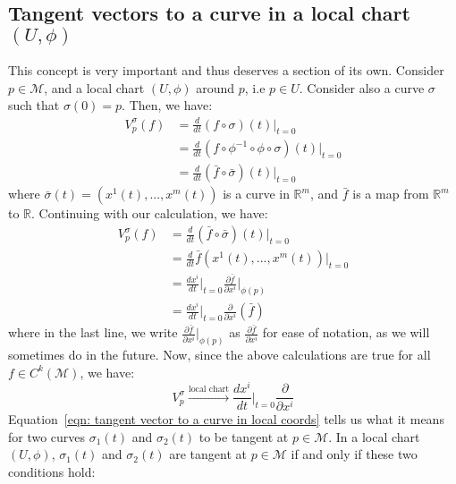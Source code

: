     \subsection{Tangent vectors to a curve in a local chart $(U,\phi)$}
      This concept is very important and thus deserves a section of its
      own. Consider $p\in \mathcal{M}$, and a local chart $(U,\phi)$ around
      $p$, i.e $p\in U$. Consider also a curve $\sigma$ such that
      $\sigma(0)= p$.
      Then, we have:
        \begin{align*}
          V^{\sigma}_{p}(f) &= \frac{d}{dt}(f\circ\sigma)(t)\Bigr|_{t=0} \\
          &= \frac{d}{dt}(f\circ\phi^{-1}\circ \phi \circ
          \sigma)(t)\Bigr|_{t=0} \\
          &= \frac{d}{dt}(\bar{f}\circ\bar{\sigma})(t)\Bigr|_{t=0}
        \end{align*}
      where $\bar{\sigma}(t) = \left(x^1(t),...,x^m(t)\right)$ is a curve
      in $\mathbb{R}^m$, and $\bar{f}$ is a map from $\mathbb{R}^m$ to
      $\mathbb{R}$. Continuing with our calculation, we have:
        \begin{align*}
          V^{\sigma}_{p}(f)
          &=\frac{d}{dt}(\bar{f}\circ\bar{\sigma})(t)\Bigr|_{t=0} \\
          &=\frac{d}{dt}\bar{f}(x^1(t),...,x^m(t))\Bigr|_{t=0}\\
          &=\frac{dx^i}{dt}\Bigr|_{t=0}\frac{\partial \bar{f}}{\partial
          x^i}\Bigr|_{\phi(p)} \\
          &=\frac{dx^i}{dt}\Bigr|_{t=0}\frac{\partial}{\partial x^i}(\bar{f})
        \end{align*}
      where in the last line, we write $\frac{\partial \bar{f}}{\partial
      x^i}\Bigr|_{\phi(p)}$ as $\frac{\partial \bar{f}}{\partial x^i}$ for
      ease of notation, as we will sometimes do in the future. Now, since
      the above calculations are true for all $f \in C^k(\mathcal{M})$, we
      have:
      \begin{equation}
        \label{eqn: tangent vector to a curve in local coords}
        V^{\sigma}_{p} \xrightarrow{\text{local chart}}
        \frac{dx^i}{dt}\Bigr|_{t=0}\frac{\partial}{\partial x^i}
      \end{equation}
      Equation~\ref{eqn: tangent vector to a curve in local coords} tells
      us what it means for two curves $\sigma_1(t)$ and $\sigma_2(t)$ to be
      tangent at $p\in\mathcal{M}$. In a local chart $(U,\phi)$,
      $\sigma_1(t)$ and $\sigma_2(t)$ are tangent at $p\in\mathcal{M}$ if and only if these two conditions hold:
